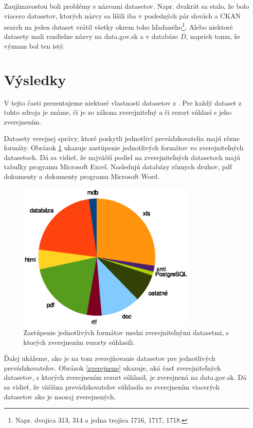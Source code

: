 \documentclass[12pt,a4paper]{article}
\begin{document}
Zaujímavosťou boli problémy s názvami datasetov. Napr. dvakrát sa stalo, že bolo viacero datasetov, ktorých názvy sa líšili iba v posledných pár slovách a CKAN search na jeden dataset vrátil všetky okrem toho hľadaného\footnote{
Napr. dvojica 313, 314 a jedna trojica 1716, 1717, 1718.
}. Alebo niektoré datasety mali rozdielne názvy na data.gov.sk a v databáze $D$, napriek tomu, že význam bol ten istý. 

\section{Výsledky}

V tejto časti prezentujeme niektoré vlastnosti datasetov z \cite{525}. Pre každý dataset z tohto zdroja je známe, či je zo zákona zverejniteľný a či rezort súhlasí s jeho zverejnením.

Datasety verejnej správy, ktoré poskytli jednotliví prevádzkovatelia majú rôzne formáty. Obrázok \ref{formaty} ukazuje zastúpenie jednotlivých formátov vo zverejniteľných datasetoch. Dá sa vidieť, že najväčší podiel na zverejniteľných datasetoch majú tabuľky programu Microsoft Excel. Nasledujú databázy rôznych druhov, pdf dokumenty a dokumenty programu Microsoft Word. 

\begin{figure}
\center \includegraphics[width=9cm]{dataset_formaty}
\caption{Zastúpenie jednotlivých formátov medzi zverejniteľnými datasetmi, s ktorých zverejnením rezorty súhlasili.}
\label{formaty}
\end{figure}

Ďalej ukážeme, ako je na tom zverejňovanie datasetov pre jednotlivých prevádzkovateľov. Obrázok \ref{zverejnene} ukazuje, aká časť zverejniteľných datasetov, s ktorých zverejnením rezort súhlasil, je zverejnená na data.gov.sk. Dá sa vidieť, že väčšina prevádzkovateľov súhlasila so zverejnením viacerých datasetov ako je naozaj zverejnených.
\end{document}
